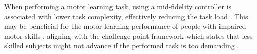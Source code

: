\documentclass[conference]{IEEEtran}
\begin{document}
When performing a motor learning task, using a mid-fidelity controller is associated with lower task complexity, effectively reducing the task load \cite{Yang2023TheSimulation}. This may be beneficial for the motor learning performance of people with impaired motor skills \cite{Sigrist2013AugmentedReview}, aligning with the challenge point framework which states that less skilled subjects might not advance if the performed task is too demanding \cite{Guadagnoll2004ChallengeLearning}. \\

\end{document}

